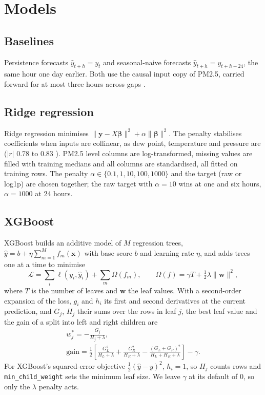 \documentclass[conference]{IEEEtran}
\newcommand{\col}[1]{\texttt{#1}}
\begin{document}
\section{Models}
\label{sec:models}

\subsection{Baselines}
Persistence forecasts $\hat{y}_{t+h} = y_t$ and seasonal-naive forecasts $\hat{y}_{t+h} = y_{t+h-24}$, the same hour one day earlier. Both use the causal input copy of PM2.5, carried forward for at most three hours across gaps \cite{datareport}.

\subsection{Ridge regression}
Ridge regression \cite{hoerl1970} minimises $\lVert \mathbf{y} - X\boldsymbol{\beta}\rVert^2 + \alpha \lVert\boldsymbol{\beta}\rVert^2$. The penalty stabilises coefficients when inputs are collinear, as dew point, temperature and pressure are ($|r|$ 0.78 to 0.83 \cite{datareport}). PM2.5 level columns are log-transformed, missing values are filled with training medians and all columns are standardised, all fitted on training rows. The penalty $\alpha \in \{0.1, 1, 10, 100, 1000\}$ and the target (raw or log1p) are chosen together; the raw target with $\alpha = 10$ wins at one and six hours, $\alpha = 1000$ at 24 hours.

\subsection{XGBoost}
XGBoost \cite{chen2016} builds an additive model of $M$ regression trees, $\hat{y} = b + \eta\sum_{m=1}^{M} f_m(\mathbf{x})$ with base score $b$ and learning rate $\eta$, and adds trees one at a time to minimise
\begin{equation}
\mathcal{L} = \sum_i \ell(y_i, \hat{y}_i) + \sum_m \Omega(f_m), \qquad \Omega(f) = \gamma T + \tfrac{1}{2}\lambda \lVert \mathbf{w}\rVert^2,
\end{equation}
where $T$ is the number of leaves and $\mathbf{w}$ the leaf values. With a second-order expansion of the loss, $g_i$ and $h_i$ its first and second derivatives at the current prediction, and $G_j$, $H_j$ their sums over the rows in leaf $j$, the best leaf value and the gain of a split into left and right children are
\begin{gather}
w_j^{*} = -\frac{G_j}{H_j + \lambda}, \\
\text{gain} = \frac{1}{2}\left[\frac{G_L^2}{H_L+\lambda} + \frac{G_R^2}{H_R+\lambda} - \frac{(G_L+G_R)^2}{H_L+H_R+\lambda}\right] - \gamma.
\end{gather}
For XGBoost's squared-error objective $\frac{1}{2}(\hat{y}-y)^2$, $h_i = 1$, so $H_j$ counts rows and \col{min\_child\_weight} sets the minimum leaf size. We leave $\gamma$ at its default of 0, so only the $\lambda$ penalty acts.
\end{document}
